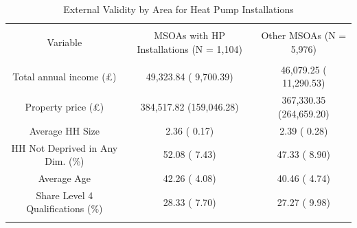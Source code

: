
\begin{table}[!htbp] \centering 
  \caption{External Validity by Area for Heat Pump Installations} 
  \label{tab:msoa_stats} 
\begin{tabular}{@{\extracolsep{5pt}} ccc} 
\\[-1.8ex]\hline 
\hline \\[-1.8ex] 
Variable & MSOAs with HP Installations (N = 1,104) & Other MSOAs (N = 5,976) \\ 
\hline \\[-1.8ex] 
Total annual income (£) &  49,323.84 (  9,700.39) &  46,079.25 ( 11,290.53) \\ 
Property price (£) & 384,517.82 (159,046.28) & 367,330.35 (264,659.20) \\ 
Average HH Size &       2.36 (      0.17) &       2.39 (      0.28) \\ 
HH Not Deprived in Any Dim. (\%) &      52.08 (      7.43) &      47.33 (      8.90) \\ 
Average Age &      42.26 (      4.08) &      40.46 (      4.74) \\ 
Share Level 4 Qualifications (\%) &      28.33 (      7.70) &      27.27 (      9.98) \\ 
\hline \\[-1.8ex] 
\end{tabular} 
\end{table} 
